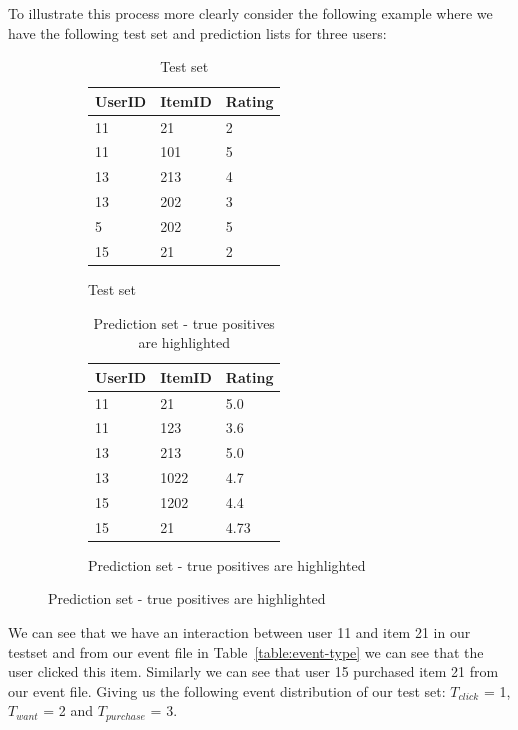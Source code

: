 To illustrate this process more clearly consider the following example where we have
the following test set and prediction lists for three users:

\begin{figure}[H]
		\begin{subfigure}{.5\textwidth}
        \begin{table}[H]
        \centering
        	\begin{tabular}{*{3}l}
        	\toprule
        			UserID	&	ItemID	 &  Rating  	\\ \midrule
        			11		&	21		 &	2			\\
        			11		&	101		 &	5			\\
        			13		&	213		 &	4			\\
        			13		&	202		 &  3			\\
        			5		&	202		 &  5			\\
        			15		&	21		 &  2			\\
        	\bottomrule
        	\end{tabular}
        	\caption{Test set}
        \end{table}
        \end{subfigure}
        \begin{subfigure}{.5\textwidth}
            \begin{table}[H]
            \centering
            	\begin{tabular}{*{3}l}
            	\toprule
            		UserID	&	ItemID	 &  Rating  	\\ \midrule
            		\rowcolor{Gray}
            		11		&	21		 &	5.0			\\
            		11		&	123		 &	3.6			\\
            		\rowcolor{Gray}
            		13		&	213		 &	5.0			\\
            		13		&	1022	 &  4.7			\\
            		15		&	1202	 &  4.4			\\
            		\rowcolor{Gray}
            		15		&	21		 &  4.73		\\
            	\bottomrule
            	\end{tabular}
            	\caption{Prediction set - true positives are highlighted}
            \end{table}
          \end{subfigure}
\end{figure}

We can see that we have an interaction between user 11 and item 21 in our testset and from our event file in
Table~\ref{table:event-type} we can see that the user clicked this item. Similarly we can see that user 15 purchased
item 21 from our event file. Giving us the following event distribution of our test set: $T_{click}$ = 1, $T_{want}$ = 2 and
$T_{purchase}$ = 3.

